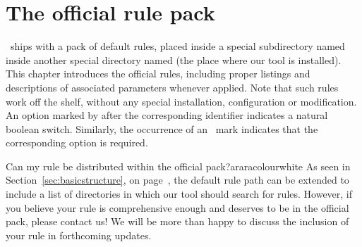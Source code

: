 \chapter{The official rule pack}
\label{chap:theofficialrulepack}

\arara\ ships with a pack of default rules, placed inside a special subdirectory named  inside another special directory named  (the place where our tool is installed). This chapter introduces the official rules, including proper listings and descriptions of associated parameters whenever applied. Note that such rules work off the shelf, without any special installation, configuration or modification. An option marked by  after the corresponding identifier indicates a natural boolean switch. Similarly, the occurrence of an \rqbox\ mark indicates that the corresponding option is required.

\begin{messagebox}{Can my rule be distributed within the official pack?}{araracolour}{\icok}{white}
As seen in Section~\ref{sec:basicstructure}, on page~\pageref{sec:basicstructure}, the default rule path can be extended to include a list of directories in which our tool should search for rules. However, if you believe your rule is comprehensive enough and deserves to be in the official pack, please contact us! We will be more  than happy to discuss the inclusion of your rule in forthcoming updates.
\end{messagebox}

